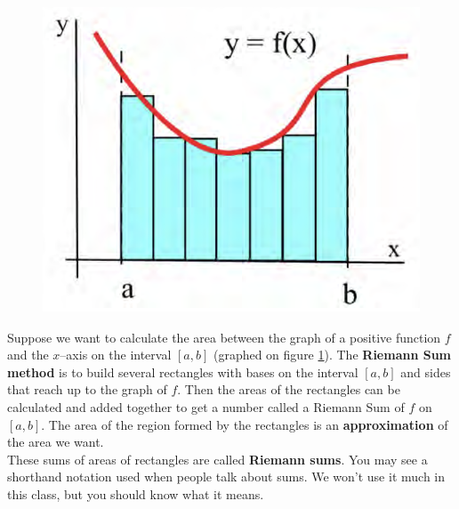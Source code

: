 \begin{figure}

\includegraphics[scale=0.4]{images/defIntgArea/RiemannSum.png}
\caption{ }
\label{fig:RiemannSum}
\end{figure}
\noindent Suppose we want to calculate the area between the graph of a positive function $f$ and the $x$–axis on the interval $[a, b]$ (graphed on figure \ref{fig:RiemannSum}). The \textbf{Riemann Sum method} is to build several rectangles with bases on the interval $[a, b]$ and sides that reach up to the graph of $f$. Then the areas of the rectangles can be calculated and added together to get a number called a Riemann Sum of $f$ on $[a, b]$. The area of the region formed by the rectangles is an \textbf{approximation} of the area we want.\\
\newpage
\noindent These sums of areas of rectangles are called \textbf{Riemann sums}. You may see a shorthand notation used when people talk about sums. We won’t use it much in this class, but you should know what it means.
\vspace{1cm}
